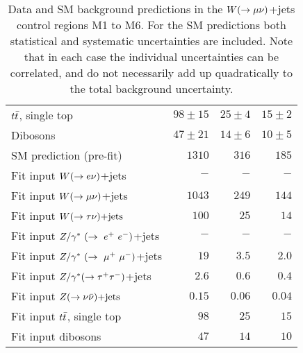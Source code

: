 \begin{table}[!ht]
\begin{center}
\begin{small}
\begin{tabular*}{\textwidth}{@{\extracolsep{\fill}}lrrr}
    $t\bar{t}$, single top               & $98 \pm 15$    & $25 \pm 4$     &  $15 \pm 2$     \\
                                                                                           
    Dibosons                           & $47 \pm 21$    & $14 \pm 6$     &  $10 \pm 5$     \\

    \hline

    SM prediction (pre-fit)                 & $1310$  & $316$ & $185$ \\                      
    \hline                                                               
                                                                         
    Fit input $W(\rightarrow e \nu)$+jets                  & $-$     & $-$   & $-$   \\
    Fit input $\wmn$+jets                  & $1043$  & $249$ & $144$ \\
    Fit input $W(\rightarrow \tau \nu)\text{+jets}$                  & $100$   & $25$  & $14$  \\
    Fit input $Z/\gamma^*~(\rightarrow~e^+~e^-)$+jets                  & $-$     & $-$   & $-$   \\
    Fit input $Z/\gamma^*~(\rightarrow~\mu^+~\mu^-)$+jets                  & $19$    & $3.5$   & $2.0$   \\
    Fit input $Z/\gamma^*(\rightarrow \tau^+ \tau^-)$+jets                  & $2.6$     & $0.6$   & $0.4$   \\
    Fit input $Z(\rightarrow \nu \bar{\nu})\text{+jets}$                  & $0.15$     & $0.06$   & $0.04$   \\
    Fit input $t\bar{t}$, single top    & $98$    & $25$  & $15$  \\
    Fit input dibosons                & $47$    & $14$  & $10$  \\

    \hline \hline

    \end{tabular*}
    \end{small}

    \end{center}
    \caption[Data and SM background predictions in the $\wmn$+jets control regions M1 to M6.]
{Data and SM background predictions in the $\wmn$+jets control regions M1 to M6. 
      For the SM predictions both statistical and systematic uncertainties are included.
        Note that in each case the individual 
        uncertainties can be correlated, and do not necessarily add up quadratically to the total background uncertainty.
    }
\label{tab:ControlRegion_CRwmn}
\end{table}
